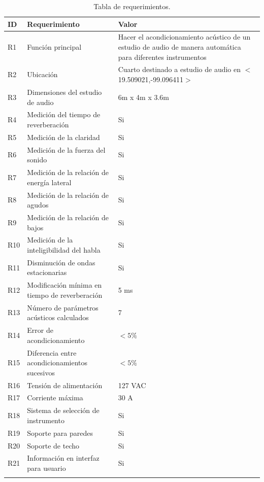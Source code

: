 \begin{center}
\footnotesize
    \begin{longtable}[!htb]{| m{3em} | m{15em} | m{10em}|}
    \hline
    \textbf{ID}& \textbf{Requerimiento} & \textbf{Valor}\\
    \hline\hline
    R1 & Funci\'on principal & Hacer el acondicionamiento acústico de un estudio de audio de manera automática para diferentes instrumentos\\
    \hline
    R2 & Ubicaci\'on & Cuarto destinado a estudio de audio en $<$19.509021,-99.096411$>$\\
    \hline
    R3 & Dimensiones del estudio de audio & 6m x 4m x 3.6m\\
    \hline
    R4 & Medición del tiempo de reverberación & Si\\
    \hline
    R5 & Medici\'on de la claridad & Si\\
    \hline
    R6 & Medici\'on de la fuerza del sonido & Si\\
    \hline
    R7 & Medici\'on de la relaci\'on de energ\'ia lateral & Si\\
    \hline
    R8 & Medici\'on de la relaci\'on de agudos & Si\\
    \hline
    R9 & Medici\'on de la relaci\'on de bajos & Si\\
    \hline
    R10 & Medici\'on de la inteligibilidad del habla & Si\\
    \hline
    R11 & Disminuci\'on de ondas estacionarias & Si \\
    \hline
    R12 & Modificaci\'on m\'inima en tiempo de reverberaci\'on & 5 ms\\
    \hline
    R13 & N\'umero de par\'ametros ac\'usticos calculados & 7\\
    \hline
    R14 & Error de acondicionamiento & $<5\%$\\
    \hline
    R15 & Diferencia entre acondicionamientos sucesivos & $<5\%$\\
    \hline
    R16 & Tensi\'on de alimentaci\'on & 127 VAC\\
    \hline
    R17 & Corriente m\'axima & 30 A \\
    \hline
    R18 & Sistema de selecci\'on de instrumento & Si\\
    \hline
    R19 & Soporte para paredes & Si\\
    \hline
    R20 & Soporte de techo & Si \\
    \hline
    R21 & Informaci\'on en interfaz para usuario & Si\\
    \hline

    \caption{Tabla de requerimientos.}
    \label{tab:Requerimientos}
    \end{longtable}
\end{center}

